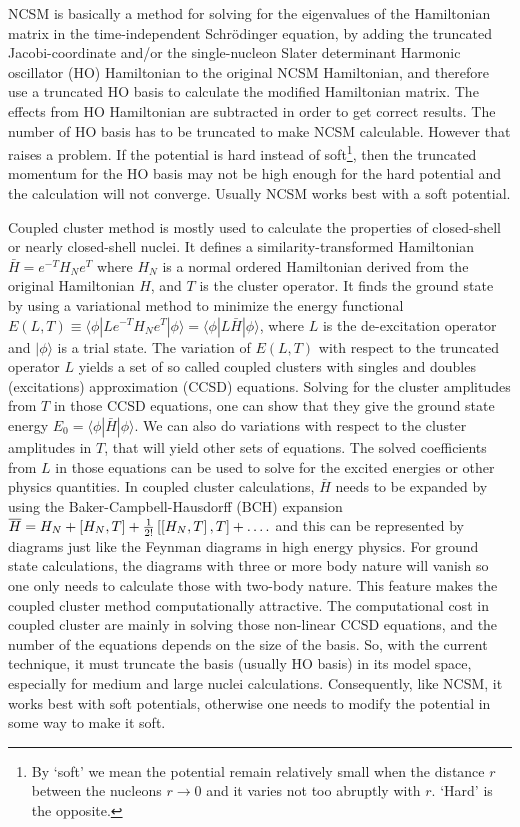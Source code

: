 \documentclass[12pt,letterpaper,UTF8]{report}
\begin{document}
NCSM is basically a method for solving for the eigenvalues of the Hamiltonian matrix in the time-independent Schr\"{o}dinger equation, by adding the truncated Jacobi-coordinate and/or the single-nucleon Slater determinant Harmonic oscillator (HO) Hamiltonian to the original NCSM Hamiltonian, and therefore use a truncated HO basis to calculate the modified Hamiltonian matrix. The effects from HO Hamiltonian are subtracted in order to get correct results.
The number of HO basis has to be truncated to make NCSM calculable.
However that raises a problem. If the potential is hard instead of soft\footnote{By `soft' we mean the potential remain relatively small when the distance $r$ between the nucleons $r \rightarrow 0$ and it varies not too abruptly with $r$. `Hard' is the opposite.},
then the truncated momentum for the HO basis may not be high enough for the hard potential and the calculation will not converge. Usually NCSM works best with a soft potential.

Coupled cluster method is mostly used to calculate the properties of closed-shell or nearly closed-shell nuclei. It defines a similarity-transformed Hamiltonian $\bar{H}=e^{-T} H_N e^{T}$ where $H_N$ is a normal ordered Hamiltonian derived from the original Hamiltonian $H$, and $T$ is the cluster operator.
It finds the ground state by using a variational method to minimize the energy functional $E(L,T) \equiv \langle \phi | L e^{-T} H_N e^{T} | \phi \rangle     =  \langle \phi | L \bar{H} | \phi \rangle $, where $L$ is the de-excitation operator and $| \phi \rangle$ is a trial state.
The variation of $E(L,T)$ with respect to the truncated operator $L$ yields a set of so called coupled clusters with singles and doubles (excitations) approximation (CCSD) equations.
Solving for the cluster amplitudes from $T$ in those CCSD equations, one can show that they give the ground state energy $E_0= \langle \phi |\bar{H} | \phi \rangle $.
We can also do variations with respect to the cluster amplitudes in $T$, that will yield other sets of equations.
The solved coefficients from $L$ in those equations can be used to solve for the excited energies or other physics quantities.
In coupled cluster calculations, $\bar{H}$ needs to be expanded by using the Baker-Campbell-Hausdorff (BCH) expansion
$\overline{H} = H_N + \left[H_N,T\right] + {1\over
2!}\left[\left[H_N,T\right],T\right]+ \ldots .$
and this can be represented by diagrams just like the Feynman diagrams in high energy physics.
For ground state calculations, the diagrams with three or more body nature will vanish so one only needs to calculate those with two-body nature. This feature makes the coupled cluster method computationally attractive. The computational cost in coupled cluster are mainly in solving those non-linear CCSD equations, and the number of the equations depends on the size of the basis. So, with the current technique, it must truncate the basis (usually HO basis) in its model space, especially for medium and large nuclei calculations. Consequently, like NCSM, it works best with soft potentials, otherwise one needs to modify the potential in some way to make it soft.
\end{document}
